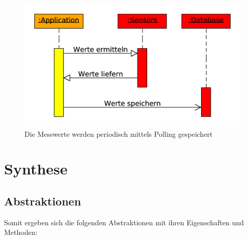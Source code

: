 \documentclass[
    10pt,
    a4paper,
]{scrartcl}
\begin{document}
\begin{figure}[ht]
    \centering
    \includegraphics[width=.7\textwidth]{sequence-store-periodic}
    \caption{Die Messwerte werden periodisch mittels Polling gespeichert}
    \label{fig:sequence-store-periodic}
\end{figure}

\section{Synthese}

\subsection{Abstraktionen}
Somit ergeben sich die folgenden Abstraktionen mit ihren Eigenschaften und Methoden:
\end{document}
